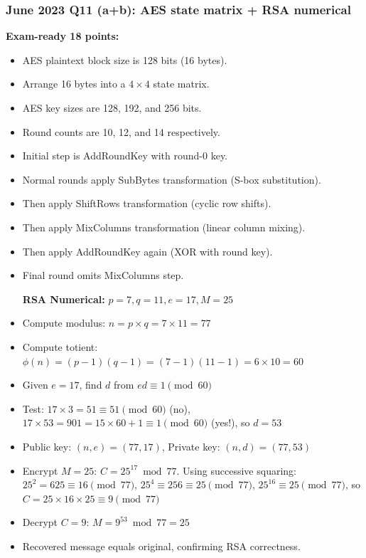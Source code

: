 \documentclass[12pt,a4paper]{article}
\begin{document}
\subsubsection*{June 2023 Q11 (a+b): AES state matrix + RSA numerical}
\textbf{Exam-ready 18 points:}
\begin{itemize}
\item AES plaintext block size is 128 bits (16 bytes).
\item Arrange 16 bytes into a \(4\times4\) state matrix.
\item AES key sizes are 128, 192, and 256 bits.
\item Round counts are 10, 12, and 14 respectively.
\item Initial step is AddRoundKey with round-0 key.
\item Normal rounds apply SubBytes transformation (S-box substitution).
\item Then apply ShiftRows transformation (cyclic row shifts).
\item Then apply MixColumns transformation (linear column mixing).
\item Then apply AddRoundKey again (XOR with round key).
\item Final round omits MixColumns step.

\textbf{RSA Numerical: } \(p=7, q=11, e=17, M=25\)
\item Compute modulus: \(n = p \times q = 7 \times 11 = 77\)
\item Compute totient: \(\phi(n) = (p-1)(q-1) = (7-1)(11-1) = 6 \times 10 = 60\)
\item Given \(e=17\), find \(d\) from \(ed \equiv 1 \pmod{60}\)
\item Test: \(17 \times 3 = 51 \equiv 51 \pmod{60}\) (no), \(17 \times 53 = 901 = 15 \times 60 + 1 \equiv 1 \pmod{60}\) (yes!), so \(d=53\)
\item Public key: \((n,e)=(77,17)\), Private key: \((n,d)=(77,53)\)
\item Encrypt \(M=25\): \(C = 25^{17} \bmod 77\). Using successive squaring: \(25^2=625 \equiv 16 \pmod{77}\), \(25^4 \equiv 256 \equiv 25 \pmod{77}\), \(25^{16} \equiv 25 \pmod{77}\), so \(C = 25 \times 16 \times 25 \equiv 9 \pmod{77}\)
\item Decrypt \(C=9\): \(M = 9^{53} \bmod 77 = 25\)
\item Recovered message equals original, confirming RSA correctness.
\end{itemize}
\end{document}

